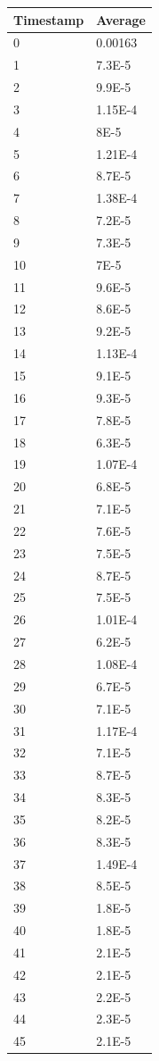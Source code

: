 %
%
\begin{tabular}{|l||l|}
\hline
	\textbf{Timestamp} & \textbf{Average} \\ \hline
	0 & 0.00163 \\ \hline
	1 & 7.3E-5 \\ \hline
	2 & 9.9E-5 \\ \hline
	3 & 1.15E-4 \\ \hline
	4 & 8E-5 \\ \hline
	5 & 1.21E-4 \\ \hline
	6 & 8.7E-5 \\ \hline
	7 & 1.38E-4 \\ \hline
	8 & 7.2E-5 \\ \hline
	9 & 7.3E-5 \\ \hline
	10 & 7E-5 \\ \hline
	11 & 9.6E-5 \\ \hline
	12 & 8.6E-5 \\ \hline
	13 & 9.2E-5 \\ \hline
	14 & 1.13E-4 \\ \hline
	15 & 9.1E-5 \\ \hline
	16 & 9.3E-5 \\ \hline
	17 & 7.8E-5 \\ \hline
	18 & 6.3E-5 \\ \hline
	19 & 1.07E-4 \\ \hline
	20 & 6.8E-5 \\ \hline
	21 & 7.1E-5 \\ \hline
	22 & 7.6E-5 \\ \hline
	23 & 7.5E-5 \\ \hline
	24 & 8.7E-5 \\ \hline
	25 & 7.5E-5 \\ \hline
	26 & 1.01E-4 \\ \hline
	27 & 6.2E-5 \\ \hline
	28 & 1.08E-4 \\ \hline
	29 & 6.7E-5 \\ \hline
	30 & 7.1E-5 \\ \hline
	31 & 1.17E-4 \\ \hline
	32 & 7.1E-5 \\ \hline
	33 & 8.7E-5 \\ \hline
	34 & 8.3E-5 \\ \hline
	35 & 8.2E-5 \\ \hline
	36 & 8.3E-5 \\ \hline
	37 & 1.49E-4 \\ \hline
	38 & 8.5E-5 \\ \hline
	39 & 1.8E-5 \\ \hline
	40 & 1.8E-5 \\ \hline
	41 & 2.1E-5 \\ \hline
	42 & 2.1E-5 \\ \hline
	43 & 2.2E-5 \\ \hline
	44 & 2.3E-5 \\ \hline
	45 & 2.1E-5 \\ \hline
\end{tabular}
